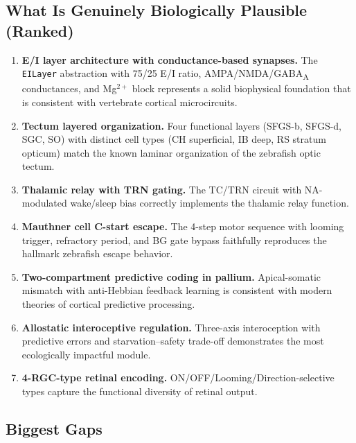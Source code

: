 \documentclass[11pt,a4paper]{article}
\begin{document}
\subsection{What Is Genuinely Biologically Plausible (Ranked)}

\begin{enumerate}[leftmargin=*]
\item \textbf{E/I layer architecture with conductance-based synapses.}
  The \texttt{EILayer} abstraction with 75/25 E/I ratio, AMPA/NMDA/GABA\textsubscript{A}
  conductances, and Mg$^{2+}$ block represents a solid biophysical foundation that
  is consistent with vertebrate cortical microcircuits.

\item \textbf{Tectum layered organization.}
  Four functional layers (SFGS-b, SFGS-d, SGC, SO) with distinct cell types
  (CH superficial, IB deep, RS stratum opticum) match the known laminar
  organization of the zebrafish optic tectum.

\item \textbf{Thalamic relay with TRN gating.}
  The TC/TRN circuit with NA-modulated wake/sleep bias correctly implements
  the thalamic relay function.

\item \textbf{Mauthner cell C-start escape.}
  The 4-step motor sequence with looming trigger, refractory period, and BG
  gate bypass faithfully reproduces the hallmark zebrafish escape behavior.

\item \textbf{Two-compartment predictive coding in pallium.}
  Apical-somatic mismatch with anti-Hebbian feedback learning is consistent
  with modern theories of cortical predictive processing.

\item \textbf{Allostatic interoceptive regulation.}
  Three-axis interoception with predictive errors and starvation--safety
  trade-off demonstrates the most ecologically impactful module.

\item \textbf{4-RGC-type retinal encoding.}
  ON/OFF/Looming/Direction-selective types capture the functional diversity
  of retinal output.
\end{enumerate}

\subsection{Biggest Gaps}
\end{document}
